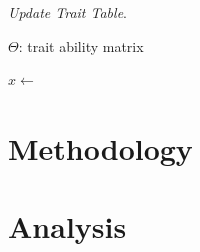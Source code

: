 \documentclass{article}
\begin{document}
  \begin{algorithm}
   \caption{\emph{Update Trait Table}.}
   \begin{algorithmic}

     \Globals
       \State $\Theta$: trait ability matrix
     \EndGlobals

     \item[]
       \State $x \gets $ 
     \EndFunction

   \end{algorithmic}
  \end{algorithm}


\section{Methodology}

\section{Analysis}
\end{document}
